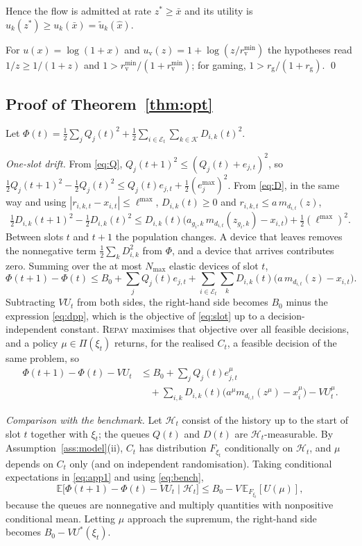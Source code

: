 \documentclass[preprint,11pt]{elsarticle}
\theoremstyle{definition}
\theoremstyle{remark}
\newcommand{\rmin}{r^{\min}}
\newcommand{\E}{\mathbb{E}}
\newcommand{\cK}{\mathcal{K}}
\newcommand{\cE}{\mathcal{E}}
\newcommand{\repay}{\textsc{Repay}}
\begin{document}
Hence the flow is admitted at rate $z^*\ge\bar x$ and its utility is $u_k(z^*)\ge u_k(\bar x)=\tilde u_k(\hat x)$.

For $u(x)=\log(1+x)$ and $u_{\mathrm{v}}(z)=1+\log(z/\rmin_{\mathrm{v}})$ the hypotheses read $1/z\ge1/(1+z)$ and $1>\rmin_{\mathrm{v}}/(1+\rmin_{\mathrm{v}})$; for gaming, $1>r_{\mathrm{g}}/(1+r_{\mathrm{g}})$. \qed

\subsection{Proof of Theorem~\ref{thm:opt}}\label{app:opt}

Let $\Phi(t)=\tfrac12\sum_jQ_j(t)^2+\tfrac12\sum_{i\in\cE_t}\sum_{k\in\cK}D_{i,k}(t)^2$.

\emph{One-slot drift.}
From \eqref{eq:Q}, $Q_j(t+1)^2\le(Q_j(t)+e_{j,t})^2$, so
$\tfrac12Q_j(t+1)^2-\tfrac12Q_j(t)^2\le Q_j(t)e_{j,t}+\tfrac12(e_j^{\max})^2$.
From \eqref{eq:D}, in the same way and using $|r_{i,k,t}-x_{i,t}|\le\ell^{\max}$, $D_{i,k}(t)\ge0$ and $r_{i,k,t}\le a\,m_{d_{i,t}}(z)$,
\[
\tfrac12D_{i,k}(t+1)^2-\tfrac12D_{i,k}(t)^2\le D_{i,k}(t)\big(a_{g_i,k}\,m_{d_{i,t}}(z_{g_i,k})-x_{i,t}\big)+\tfrac12(\ell^{\max})^2 .
\]
Between slots $t$ and $t+1$ the population changes. A device that leaves removes the nonnegative term $\tfrac12\sum_kD_{i,k}^2$ from $\Phi$, and a device that arrives contributes zero. Summing over the at most $N_{\max}$ elastic devices of slot $t$,
\[
\Phi(t+1)-\Phi(t)\le B_0+\sum_jQ_j(t)e_{j,t}+\sum_{i\in\cE_t}\sum_kD_{i,k}(t)\big(a\,m_{d_{i,t}}(z)-x_{i,t}\big).
\]
Subtracting $VU_t$ from both sides, the right-hand side becomes $B_0$ minus the expression \eqref{eq:dpp}, which is the objective of \eqref{eq:slot} up to a decision-independent constant. \repay{} maximises that objective over all feasible decisions, and a policy $\mu\in\Pi(\xi_t)$ returns, for the realised $C_t$, a feasible decision of the same problem, so
\begin{equation}\label{eq:app1}\begin{aligned}
\Phi(t+1)-\Phi(t)-VU_t&\le B_0+\sum_jQ_j(t)e^{\mu}_{j,t}\\&\quad+\sum_{i,k}D_{i,k}(t)\big(a^\mu m_{d_{i,t}}(z^\mu)-x^\mu_{i}\big)-VU^{\mu}_t .
\end{aligned}\end{equation}

\emph{Comparison with the benchmark.}
Let $\mathcal H_t$ consist of the history up to the start of slot $t$ together with $\xi_t$; the queues $Q(t)$ and $D(t)$ are $\mathcal H_t$-measurable.
By Assumption~\ref{ass:model}(ii), $C_t$ has distribution $F_{\xi_t}$ conditionally on $\mathcal H_t$, and $\mu$ depends on $C_t$ only (and on independent randomisation).
Taking conditional expectations in \eqref{eq:app1} and using \eqref{eq:bench},
\[
\E\big[\Phi(t+1)-\Phi(t)-VU_t\mid\mathcal H_t\big]\le B_0-V\,\E_{F_{\xi_t}}[U(\mu)],
\]
because the queues are nonnegative and multiply quantities with nonpositive conditional mean.
Letting $\mu$ approach the supremum, the right-hand side becomes $B_0-VU^*(\xi_t)$.
\end{document}
